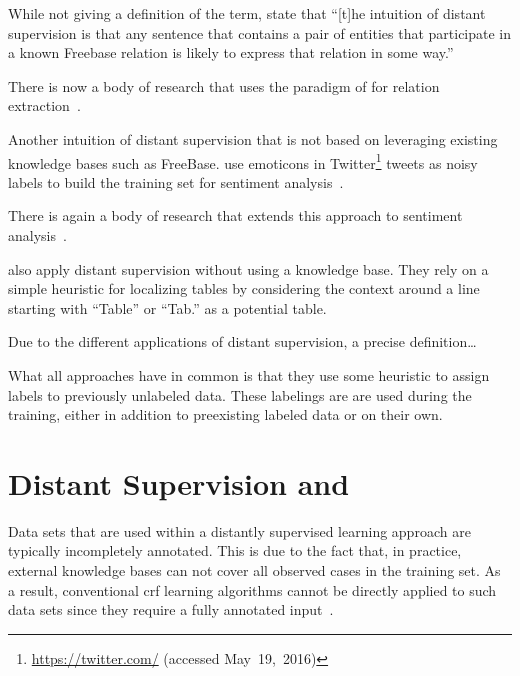 While not giving a definition of the term, \citet{mintz2009distant} state that ``[t]he intuition of distant supervision is that any sentence that contains a pair of entities that participate in a known Freebase relation is likely to express that relation in some way.''

There is now a body of research that uses the paradigm of \citet{mintz2009distant} for relation extraction~\citep{benson2011event,ritter2011named,nguyen2011end,takamatsu2012reducing,xu2013filling}.

\bigskip

Another intuition of \gls{distant supervision} that is not based on leveraging existing knowledge bases such as FreeBase.
\citet{go2009twitter} use emoticons in Twitter\footnote{\url{https://twitter.com/} (accessed May~19,~2016)} tweets as noisy labels to build the training set for sentiment analysis~\citep{go2009twitter}.

There is again a body of research that extends this approach to sentiment analysis~\citep{purver2012experimenting,marchetti2012learning,suttles2013distant}.

\citet{fan2015detecting} also apply distant supervision without using a knowledge base.
They rely on a simple heuristic for localizing tables by considering the context around a line starting with ``Table'' or ``Tab.'' as a potential table.

\bigskip

Due to the different applications of \gls{distant supervision}, a precise definition\dots

What all approaches have in common is that they use some heuristic to assign labels to previously unlabeled data. These labelings are are used during the training, either in addition to preexisting labeled data or on their own.

\section{Distant Supervision and }

Data sets that are used within a distantly supervised learning approach are typically incompletely annotated.
This is due to the fact that, in practice, external knowledge bases can not cover all observed cases in the training set.
As a result, conventional \gls{crf} learning algorithms cannot be directly applied to such data sets since they require a fully annotated input~\citep{tsuboi2008training}.

